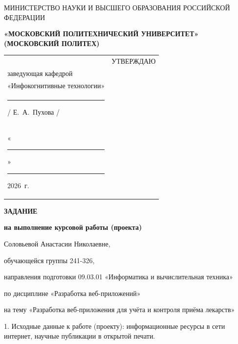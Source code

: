 \documentclass[14pt, a4paper]{extarticle}
\begin{document}
\pagestyle{empty}


\begin{center}
    {\small МИНИСТЕРСТВО НАУКИ И ВЫСШЕГО ОБРАЗОВАНИЯ РОССИЙСКОЙ ФЕДЕРАЦИИ}


    {\small \textbf{«МОСКОВСКИЙ ПОЛИТЕХНИЧЕСКИЙ УНИВЕРСИТЕТ»}} \\
    {\small \textbf{(МОСКОВСКИЙ ПОЛИТЕХ)}}
\end{center}

\begin{tabularx}{\textwidth}{@{} p{} p{} @{}}
     &
    \raggedright
    УТВЕРЖДАЮ                          \\
    заведующая кафедрой                \\
    «Инфокогнитивные технологии»       \\[0.3cm]

    \rule{3cm}{0.4pt} / Е.~А.~Пухова / \\[0.1cm]

    «\rule{0.8cm}{0.4pt}» \rule{3cm}{0.4pt} 2026~г.
\end{tabularx}


\begin{center}

    { \large \textbf{ЗАДАНИЕ}}

    \textbf{на выполнение курсовой работы (проекта)}

    Соловьевой Анастасии Николаевне, %

\end{center}

обучающейся группы 241-326,

направления подготовки 09.03.01 «Информатика и вычислительная техника»

по дисциплине «Разработка веб-приложений»

на тему «Разработка веб-приложения для учёта и контроля приёма лекарств»

1. Исходные данные к работе (проекту): информационные ресурсы в сети
интернет, научные публикации в открытой печати.
\end{document}
